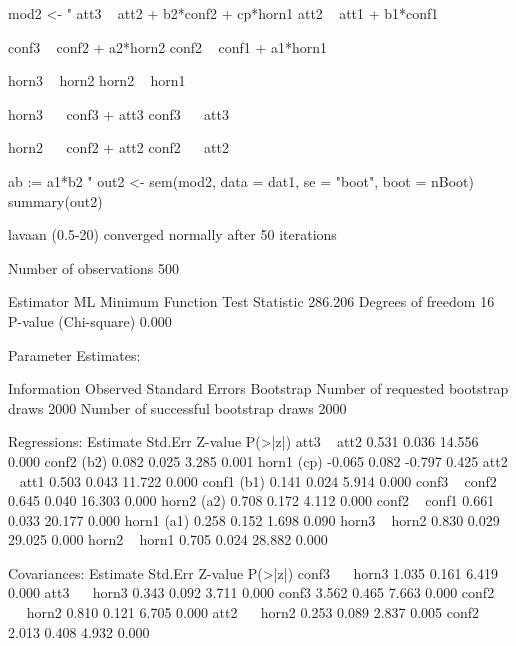 \begin{Schunk}
\begin{Sinput}
 mod2 <- "
 att3 ~ att2 + b2*conf2 + cp*horn1
 att2 ~ att1 + b1*conf1
 
 conf3 ~ conf2 + a2*horn2
 conf2 ~ conf1 + a1*horn1
 
 horn3 ~ horn2
 horn2 ~ horn1
 
 horn3 ~~ conf3 + att3
 conf3 ~~ att3
 
 horn2 ~~ conf2 + att2
 conf2 ~~ att2
 
 ab := a1*b2
 "
 out2 <- sem(mod2, data = dat1, se = "boot", boot = nBoot)
 summary(out2)
\end{Sinput}
\begin{Soutput}
lavaan (0.5-20) converged normally after  50 iterations

  Number of observations                           500

  Estimator                                         ML
  Minimum Function Test Statistic              286.206
  Degrees of freedom                                16
  P-value (Chi-square)                           0.000

Parameter Estimates:

  Information                                 Observed
  Standard Errors                            Bootstrap
  Number of requested bootstrap draws             2000
  Number of successful bootstrap draws            2000

Regressions:
                   Estimate  Std.Err  Z-value  P(>|z|)
  att3 ~                                              
    att2              0.531    0.036   14.556    0.000
    conf2     (b2)    0.082    0.025    3.285    0.001
    horn1     (cp)   -0.065    0.082   -0.797    0.425
  att2 ~                                              
    att1              0.503    0.043   11.722    0.000
    conf1     (b1)    0.141    0.024    5.914    0.000
  conf3 ~                                             
    conf2             0.645    0.040   16.303    0.000
    horn2     (a2)    0.708    0.172    4.112    0.000
  conf2 ~                                             
    conf1             0.661    0.033   20.177    0.000
    horn1     (a1)    0.258    0.152    1.698    0.090
  horn3 ~                                             
    horn2             0.830    0.029   29.025    0.000
  horn2 ~                                             
    horn1             0.705    0.024   28.882    0.000

Covariances:
                   Estimate  Std.Err  Z-value  P(>|z|)
  conf3 ~~                                            
    horn3             1.035    0.161    6.419    0.000
  att3 ~~                                             
    horn3             0.343    0.092    3.711    0.000
    conf3             3.562    0.465    7.663    0.000
  conf2 ~~                                            
    horn2             0.810    0.121    6.705    0.000
  att2 ~~                                             
    horn2             0.253    0.089    2.837    0.005
    conf2             2.013    0.408    4.932    0.000


\end{Soutput}
\end{Schunk}
